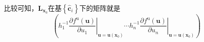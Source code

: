 \documentclass[main.tex]{subfiles}
\begin{document}
比较可知，$\mathbf{L}_{\mathbf{x}_0}$在基$\left\{\mathbf{\hat{c}}_i\right\}$下的矩阵就是
\[\left(h_1^{-1}\left.\frac{\partial f^\mathrm{u}\left(\mathbf{u}\right)}{\partial u_1}\right|_{\mathbf{u}=\mathbf{u}\left(\mathbf{x}_0\right)}\cdots h_n^{-1}\left.\frac{\partial f^\mathrm{u}\left(\mathbf{u}\right)}{\partial u_n}\right|_{\mathbf{u}=\mathbf{u}\left(\mathbf{x}_0\right)}\right)\]
\end{document}
